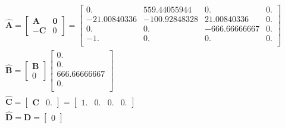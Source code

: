 \documentclass[
	12pt,				%
	article,			%
	openright,			%
	oneside,
	a4paper,			%
	chapter=TITLE,		%
	section=TITLE,		%
	english,			%
	french,				%
	spanish,			%
	brazil,				%
]{abntex2}
\begin{document}
                \begin{eqnarray}
                    \nonumber
                    \boldsymbol{\hat{A}} =
                    \begin{bmatrix}
                        \boldsymbol{A} & \boldsymbol{0} \\
                        \boldsymbol{-C} & 0
                    \end{bmatrix} = 
                    \begin{bmatrix}
                        0.           & 559.44055944  & 0.            & 0.        \\
                        -21.00840336 & -100.92848328 & 21.00840336   & 0.        \\
                        0.           & 0.            & -666.66666667 & 0.        \\
                        -1.          & 0.            & 0.            & 0.        \\
                    \end{bmatrix} \\
                    \nonumber
                    \boldsymbol{\hat{B}} =
                    \begin{bmatrix}
                        \boldsymbol{B} \\
                        0
                    \end{bmatrix}
                    \begin{bmatrix}
                        0.           \\
                        0.           \\
                        666.66666667 \\
                        0.           \\
                    \end{bmatrix} \\
                    \nonumber
                    \boldsymbol{\hat{C}} = 
                    \begin{bmatrix}
                        \boldsymbol{C} & 0.
                    \end{bmatrix} = 
                    \begin{bmatrix}
                        1. & 0. & 0. & 0.
                    \end{bmatrix} \\
                    \nonumber
                    \boldsymbol{\hat{D}} = \boldsymbol{D} = \begin{bmatrix} 0 \end{bmatrix} \\

\end{eqnarray}
\end{document}

